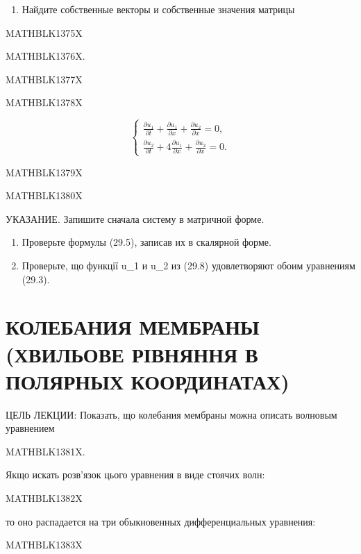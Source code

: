 \documentclass[
  ukrainian,
]{article}
\providecommand{\tightlist}{%
  \setlength{\itemsep}{0pt}\setlength{\parskip}{0pt}}
\begin{document}
\begin{enumerate}
\def\labelenumi{\arabic{enumi}.}
\setcounter{enumi}{1}
\tightlist
\item
  Найдите собственные векторы и собственные значения матрицы
\end{enumerate}

MATHBLK1375X

MATHBLK1376X.

MATHBLK1377X

MATHBLK1378X

\[
\begin{cases} \frac{\partial u_1}{\partial t} + \frac{\partial u_1}{\partial x} + \frac{\partial u_2}{\partial x} = 0, \\ \frac{\partial u_2}{\partial t} + 4 \frac{\partial u_1}{\partial x} + \frac{\partial u_2}{\partial x} = 0. \end{cases}
\]

MATHBLK1379X

MATHBLK1380X

УКАЗАНИЕ. Запишите сначала систему в матричной форме.

\begin{enumerate}
\def\labelenumi{\arabic{enumi}.}
\setcounter{enumi}{3}
\item
  Проверьте формулы (29.5), записав их в скалярной форме.
\item
  Проверьте, що функції u\_1 и u\_2 из (29.8) удовлетворяют обоим
  уравнениям (29.3).
\end{enumerate}

\section{КОЛЕБАНИЯ МЕМБРАНЫ (ХВИЛЬОВЕ РІВНЯННЯ В ПОЛЯРНЫХ
КООРДИНАТАХ)}\label{ux43aux43eux43bux435ux431ux430ux43dux438ux44f-ux43cux435ux43cux431ux440ux430ux43dux44b-ux445ux432ux438ux43bux44cux43eux432ux435-ux440ux456ux432ux43dux44fux43dux43dux44f-ux432-ux43fux43eux43bux44fux440ux43dux44bux445-ux43aux43eux43eux440ux434ux438ux43dux430ux442ux430ux445}

ЦЕЛЬ ЛЕКЦИИ: Показать, що колебания мембраны можна описать волновым
уравнением

MATHBLK1381X.

Якщо искать розв'язок цього уравнения в виде стоячих волн:

MATHBLK1382X

то оно распадается на три обыкновенных дифференциальных уравнения:

MATHBLK1383X
\end{document}
